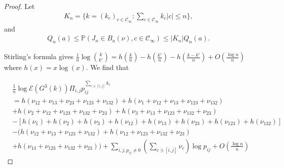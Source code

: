 \documentclass[11pt,en,cite=authoryear]{elegantpaper}
\begin{document}
\begin{proof}
    Let
    \begin{align*}
        K_n = \biggl\{k=(k_c)_{c\in \mathcal{C}_{\infty}}: \sum_{c \in \mathcal{C}_{\infty}} k_{c} |c| \le n \biggr\},
    \end{align*}
    and 
    \begin{align*}
        Q_n(a) 
        \le \mathbb{P}(J_{n} \in B_a(\nu), c \in \mathcal{C}_{\infty})
        \le |K_n| Q_n(a).
    \end{align*}

    Stirling's formula gives
    $\frac{1}{n} \log \binom{k}{k'} = h(\frac{k}{n} ) - h(\frac{k'}{n}) - h(\frac{k-k'}{n}) + O(\frac{\log n}{n})$
    where $h(x)=x\log(x)$. We find that

    \begin{align*}
        &\frac{1}{n} \log \mathcal{E} (G^3(k)) \Pi_{i, j} p_{ij}^{\sum_{c \ni [i,j]} k_{c}} \\
        &= h(\nu_{12} + \nu_{13} + \nu_{23}+\nu_{123}+\nu_{132}) 
        + h(\nu_1 + \nu_{12} + \nu_{13} + \nu_{123} +\nu_{132}) \\
        &+ h(\nu_2 + \nu_{12} + \nu_{123} + \nu_{132} +\nu_{23})
        + h(\nu_3 + \nu_{13} +\nu_{123} +\nu_{132} +\nu_{23}) \\
        &- \left[h(\nu_1) + h(\nu_2) + h(\nu_3) + h(\nu_{12}) + h(\nu_{13}) + h(\nu_{23}) + h(\nu_{123}) + h(\nu_{132})\right] \\
        &- \biggl(h(\nu_{12} + \nu_{13} + \nu_{123} +\nu_{132}) + h(\nu_{12} + \nu_{123} + \nu_{132} +\nu_{23}) \\
        & + h(\nu_{13} +\nu_{123} +\nu_{132} +\nu_{23})\biggr)
        +\sum_{i, j, p_{ij}\neq 0} (\sum_{c \ni[i, j]} \nu_{c}) \log p_{ij} + O(\frac{\log n}{n})
    \end{align*}


\end{proof}
\end{document}
